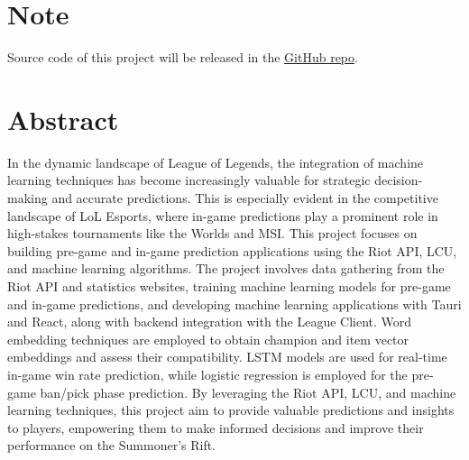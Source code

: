 \documentclass[11pt,a4paper,oneside]{report}
\newcommand{\instructions}[1]{{\color{orange}\itshape #1}}
\renewcommand{\instructions}[1]{}
\begin{document}

\clearpage
{}


\setcounter{tocdepth}{0} %
\tableofcontents


\chapter*{Note}

Source code of this project will be released in the \href{https://github.com/lywlywly/signature-work}{GitHub repo}.

\vspace{4\bigskipamount}



\chapter*{Abstract}


\instructions{Abstract (English): 150 -- 200 words. An abstract is a brief
  statement of the problem or the purpose of the research. It should indicate
  the theoretical work or experimental plan used, summarize principal findings
  of the research, and point out major conclusions. Appropriate safety
  information should be included when applicable. This should be the section
  you write last to be sure that it accurately reflects the content of the
  document.}

In the dynamic landscape of League of Legends, the integration of machine learning techniques has become increasingly valuable for strategic decision-making and accurate predictions. This is especially evident in the competitive landscape of LoL Esports, where in-game predictions play a prominent role in high-stakes tournaments like the Worlds and MSI. This project focuses on building pre-game and in-game prediction applications using the Riot API, LCU, and machine learning algorithms. The project involves data gathering from the Riot API and statistics websites, training machine learning models for pre-game and in-game predictions, and developing machine learning applications with Tauri and React, along with backend integration with the League Client. Word embedding techniques are employed to obtain champion and item vector embeddings and assess their compatibility. LSTM models are used for real-time in-game win rate prediction, while logistic regression is employed for the pre-game ban/pick phase prediction. By leveraging the Riot API, LCU, and machine learning techniques, this project aim to provide valuable predictions and insights to players, empowering them to make informed decisions and improve their performance on the Summoner's Rift.
\end{document}
